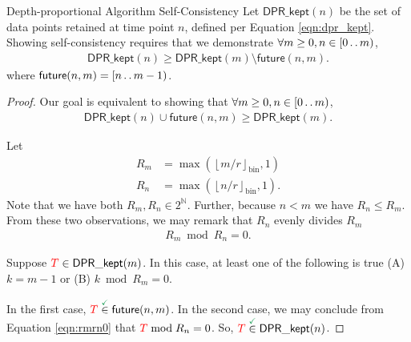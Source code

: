 \begin{theorem}{Depth-proportional Algorithm Self-Consistency}
\label{thm:depth-proportional-algo-self-consistency}
Let $\mathsf{DPR\_kept}(n)$ be the set of data points retained at time point $n$, defined per Equation \ref{eqn:dpr_kept}.
Showing self-consistency requires that we demonstrate $\forall m \geq 0, n \in [0 \mathinner {\ldotp \ldotp} m)$,
\begin{align*}
\mathsf{DPR\_kept}(n)
\geq
\mathsf{DPR\_kept}(m)
\setminus
\mathsf{future}(n, m).
\end{align*}
where $\mathsf{future}(n, m) = [n \mathinner {\ldotp \ldotp} m - 1)$.
\end{theorem}

\begin{proof}
\label{prf:depth-proportional-algo-self-consistency}
Our goal is equivalent to showing that $\forall m \geq 0, n \in [0 \mathinner {\ldotp \ldotp} m)$,
\begin{align*}
\mathsf{DPR\_kept}(n) \cup \mathsf{future}(n, m) \geq \mathsf{DPR\_kept}(m).
\end{align*}

Let
\begin{align*}
R_m
&=
\max(\left\lfloor m / r \right\rfloor_{\mathrm{bin}}, 1)\\
R_n
&=
\max(\left\lfloor n / r \right\rfloor_{\mathrm{bin}}, 1).
\end{align*}
Note that we have both $R_m, R_n \in 2^{\mathbb{N}}$.
Further, because $n < m$ we have $R_n \leq R_m$.
From these two observations, we may remark that $R_n$ evenly divides $R_m$
\begin{align}
R_m \bmod R_n = 0.
\label{eqn:rmrn0}
\end{align}

Suppose $\colorTbar \in \mathsf{DPR\_kept}(m)$.
In this case, at least one of the following is true (A) $k = m - 1$ or (B) $k \bmod R_m = 0$.

In the first case, $\colorTbar \stackrel{\checkmark}{\in} \mathsf{future}(n, m)$.
In the second case, we may conclude from Equation \ref{eqn:rmrn0} that $\colorTbar \bmod R_n = 0$.
So, $\colorTbar \stackrel{\checkmark}{\in} \mathsf{DPR\_kept}(n)$.
\end{proof}
